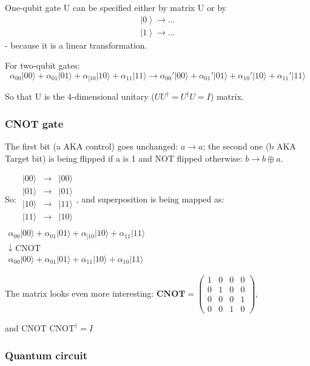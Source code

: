 \documentclass{scrartcl}
\newcommand{\ket}[1]{\left| #1 \right>} %
\begin{document}
One-qubit gate U can be specified either by matrix U or by
\begin{gather*} \ket0 \to \dots \\ \ket1 \to \dots \end{gather*} - because it is
a linear transformation.

For two-qubit gates: $$\alpha_{00} |00\rangle + \alpha_{01} |01\rangle +
\alpha_{[10} |10\rangle + \alpha_{11} |11\rangle \to \alpha_{00}' |00\rangle +
\alpha_{01}' |01\rangle + \alpha_{10}' |10\rangle + \alpha_{11}' |11\rangle$$

So that U is the 4-dimensional unitary ($UU^\dag = U^\dag U = I$) matrix.

\subsubsection{CNOT gate}
\label{sec:6-1-1}

The first bit (a AKA control) goes unchanged: $a \to a$; the second one (b AKA
Target bit) is being flipped if a is 1 and NOT flipped otherwise: $b \to b
\oplus a$.

So: $\begin{array}{ccc}
  |00\rangle & \to & |00\rangle \\
  |01\rangle & \to & |01\rangle \\
  |10\rangle & \to & |11\rangle \\
  |11\rangle & \to & |10\rangle \\
\end{array}$, and superposition is being mapped as: $\begin{array}{c}
  \alpha_{00} |00\rangle + \alpha_{01} |01\rangle + \alpha_{[10} |10\rangle +
  \alpha_{11} |11\rangle \\
  \downarrow \mbox{ CNOT } \\
  \alpha_{00} |00\rangle + \alpha_{01} |01\rangle + \alpha_{11} |10\rangle +
  \alpha_{10} |11\rangle 
\end{array}$

The matrix looks even more interesting: $\mathbf{CNOT} = \left(
  \begin{array}{cccc}
    1 & 0 & 0 & 0 \\ 0 & 1 & 0 & 0 \\ 0 & 0 & 0 & 1 \\ 0 & 0 & 1 & 0
  \end{array}
\right)$,

and $\mbox{CNOT CNOT}^\dag = I$

\subsubsection{Quantum circuit}
\label{sec:6-1-2}
\end{document}
